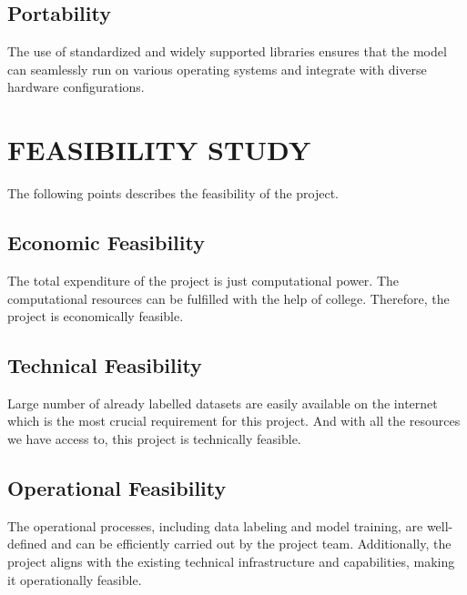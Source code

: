             \subsection{Portability}
                The use of standardized and widely supported libraries ensures that the model can seamlessly run on various operating systems and integrate with diverse hardware configurations.
            
        \section{FEASIBILITY STUDY}
            The following points describes the feasibility of the project.

            \subsection{Economic Feasibility}
                The total expenditure of the project is just computational power. The computational resources can be fulfilled with the help of college. Therefore, the project is economically feasible.

            \subsection{Technical Feasibility}
                Large number of already labelled datasets are easily available on the internet which is the most crucial requirement for this project. And with all the resources we have access to, this project is technically feasible.

            \subsection{Operational Feasibility}
                The operational processes, including data labeling and model training, are well-defined and can be efficiently carried out by the project team. Additionally, the project aligns with the existing technical infrastructure and capabilities, making it operationally feasible.

            
